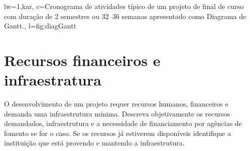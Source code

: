 \begin{keyfigure}{lw=1,kar,	c={Cronograma de atividades típico de um projeto de final de curso com duração de 2 semestres ou 32--36 semanas apresentado como Diagrama de Gantt.},	l=fig:diagGantt}
	\centering
\end{keyfigure}	


\section{Recursos financeiros e infraestratura}

O desenvolvimento de um projeto  requer recursos humanos, financeiros e demanda uma  infraestrutura mínima. Descreva objetivamente os recursos demandados, infraestrutura e a necessidade de financiamento por agências de fomento se for o caso. Se os recursos já estiverem disponíveis identifique a instituição que está provendo e mantendo a infraestrutura.

